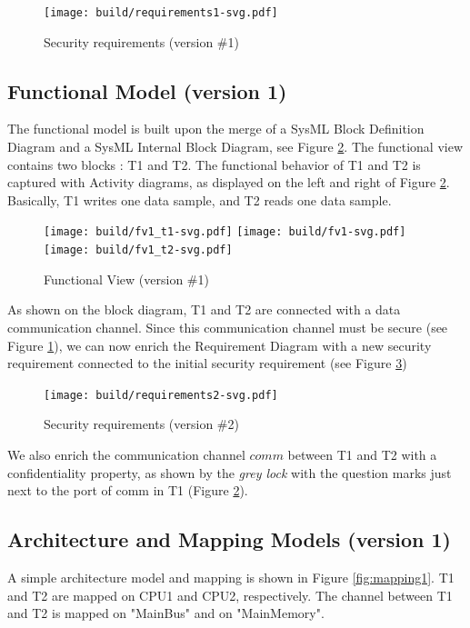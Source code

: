 \documentclass[12pt]{article}
\begin{document}
\begin{figure}[htbp]
\centering
\texttt{[image: build/requirements1-svg.pdf]}
\caption{Security requirements (version \#1)} \label{fig:req1}
\end{figure}

\subsection{Functional Model (version 1)}
The functional model is built upon the merge of a  SysML Block Definition Diagram and a SysML Internal Block Diagram, see Figure \ref{fig:fv1}. The functional view contains two blocks : T1 and T2.  The functional behavior of T1 and T2 is captured with Activity diagrams, as displayed on the left and right of Figure \ref{fig:fv1}. Basically, T1 writes one data sample, and T2 reads one data sample.


\begin{figure}[htbp]
\centering
\texttt{[image: build/fv1\_t1-svg.pdf]}
\texttt{[image: build/fv1-svg.pdf]}
\texttt{[image: build/fv1\_t2-svg.pdf]}
\caption{Functional View (version \#1)} \label{fig:fv1}
\end{figure}

As shown on the block diagram, T1 and T2 are connected with a data communication channel. Since this communication channel must be secure (see Figure \ref{fig:req1}), we can now enrich the Requirement Diagram with a new security requirement connected to the initial security requirement (see Figure \ref{fig:req2})

\begin{figure}[htbp]
\centering
\texttt{[image: build/requirements2-svg.pdf]}
\caption{Security requirements (version \#2)} \label{fig:req2}
\end{figure}

We also enrich the communication channel $comm$ between T1 and T2 with a confidentiality property, as shown by the \textit{grey lock} with the question marks just next to the port of comm in T1 (Figure \ref{fig:fv1}).

\subsection{Architecture and Mapping Models (version 1)}

A simple architecture model and mapping is shown in Figure \ref{fig:mapping1}. T1 and T2 are mapped on CPU1 and CPU2, respectively. The channel between T1 and T2 is mapped on "MainBus" and on "MainMemory".
\end{document}

